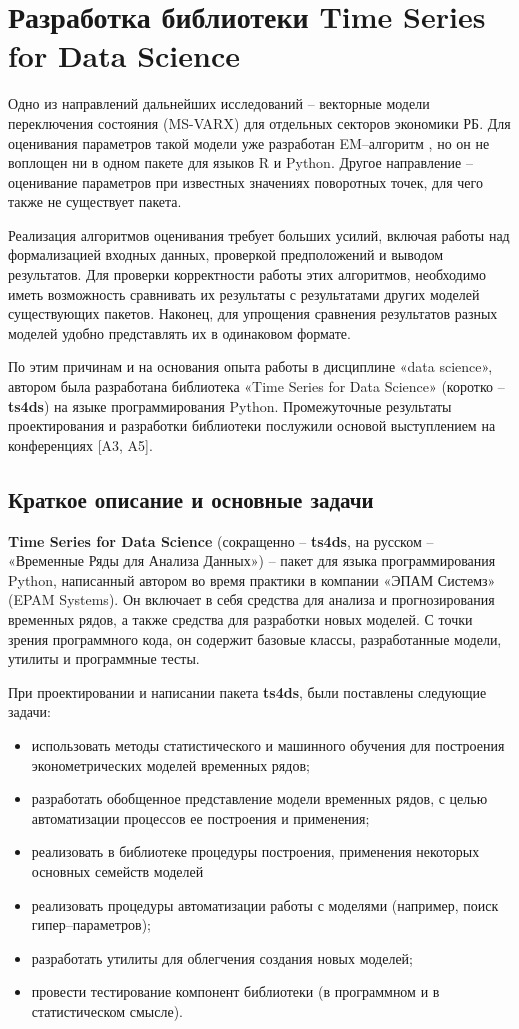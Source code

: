 \documentclass[../report.tex]{subfiles}
\begin{document}
	
	\chapter{Разработка библиотеки Time Series for Data Science}
	
	Одно из направлений дальнейших исследований – векторные модели переключения состояния (MS-VARX) для отдельных секторов экономики РБ. Для оценивания параметров такой модели уже разработан EM–алгоритм \cite{malNovopMSVARX}, но он не воплощен ни в одном пакете для языков R и Python. Другое направление – оценивание параметров при известных значениях поворотных точек, для чего также не существует пакета.
	
	Реализация алгоритмов оценивания требует больших усилий, включая работы над формализацией входных данных, проверкой предположений и выводом результатов. Для проверки корректности работы этих алгоритмов, необходимо иметь возможность сравнивать их результаты с результатами других моделей существующих пакетов. Наконец, для упрощения сравнения результатов разных моделей удобно представлять их в одинаковом формате.
	
	По этим причинам и на основания опыта работы в дисциплине «data science», автором была разработана библиотека «Time Series for Data Science» (коротко – \textbf{ts4ds}) на языке программирования Python. Промежуточные результаты проектирования и разработки библиотеки послужили основой выступлением на конференциях [A3, A5].
	
	\section{Краткое описание и основные задачи}
	
	\textbf{Time Series for Data Science} (сокращенно – \textbf{ts4ds}, на русском – «Временные Ряды для Анализа Данных») – пакет для языка программирования Python, написанный автором во время практики в компании «ЭПАМ Системз» (EPAM Systems). Он включает в себя средства для анализа и прогнозирования временных рядов, а также средства для разработки новых моделей. С точки зрения программного кода, он содержит базовые классы, разработанные модели, утилиты и программные тесты.
	
	При проектировании и написании пакета \textbf{ts4ds}, были поставлены следующие задачи:
	\begin{itemize}
		\item использовать методы статистического и машинного обучения для построения эконометрических моделей временных рядов;
		\item разработать обобщенное представление модели временных рядов, с целью автоматизации процессов ее построения и применения;
		\item реализовать в библиотеке процедуры построения, применения некоторых основных семейств моделей
		\item реализовать процедуры автоматизации работы с моделями (например, поиск гипер–параметров);
		\item разработать утилиты для облегчения создания новых моделей;
		\item провести тестирование компонент библиотеки (в программном и в статистическом смысле).
	\end{itemize}
	
\end{document}
